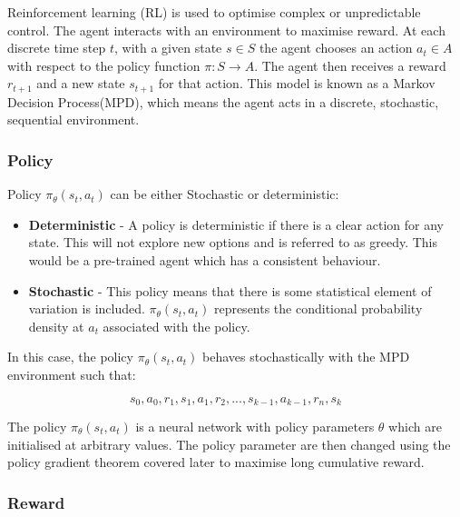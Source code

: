 Reinforcement learning (RL) \cite{rl1} is used to optimise complex or unpredictable control. The agent interacts with an environment to maximise reward. At each discrete time step $t$, with a given state $s \in S$ the agent chooses an action $a_t \in A$ with respect to the policy function $\pi : S \xrightarrow{} A$. The agent then receives a reward $r_{t+1}$ and a new state $s_{t+1}$ for that action\cite{ac1}. This model is known as a Markov Decision Process(MPD)\cite{mar1}, which means the agent acts in a discrete, stochastic, sequential environment.

\subsubsection{Policy}
Policy \begin{math}\pi_\theta(s_t,a_t)\end{math} can be either Stochastic or deterministic:

\begin{itemize}
\item
\textbf{Deterministic} -
A policy is deterministic if there is a clear action for any state. This will not explore new options and is referred to as greedy. This would be a pre-trained agent which has a consistent behaviour.

\item
\textbf{Stochastic } -
This policy means that there is some statistical element of variation is included.  $ \pi_\theta(s_t,a_t) $ represents the conditional probability density at $a_t$ associated with the policy.\cite{ac2} 

\end{itemize}

In this case, the policy \begin{math}\pi_\theta(s_t,a_t)\end{math} behaves stochastically with the MPD environment such that:

 \[s_0,a_0,r_1,s_1,a_1,r_2, ... ,s_{k-1},a_{k-1},r_n,s_k\]

The policy $\pi_\theta(s_t,a_t)$ is a neural network with policy parameters $\theta$ which are initialised at arbitrary values. The policy parameter are then changed using the policy gradient theorem covered later\cite{rl2} to maximise long cumulative reward.
 
\subsubsection{Reward}

